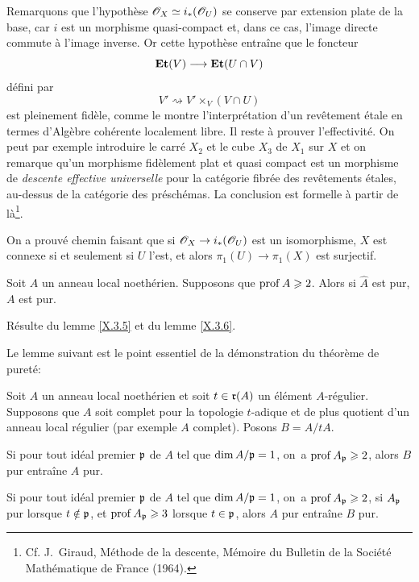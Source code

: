 Remarquons que l'hypoth\`ese $\mathscr{O}_X\simeq i_\ast({\mathscr O}_U)$ se conserve par extension plate de la base, car $i$ est un morphisme quasi-compact et, dans ce cas, l'image directe commute \`a l'image inverse. Or cette hypoth\`ese entra\^ine que le foncteur
\[
\Et(V) \to \Et(U\cap V)
\]
d\'efini par
\[
V'\rightsquigarrow V'\times_V(V\cap U)
\]
est pleinement fid\`ele, comme le montre l'interpr\'etation d'un rev\^etement \'etale en termes d'Alg\`ebre coh\'erente localement libre. Il reste \`a prouver l'effectivit\'e. On peut par exemple introduire le carr\'e $X_2$ et le cube $X_3$ de $X_1$ sur $X$ et on remarque qu'un morphisme fid\`element plat et quasi compact est un morphisme de \emph{descente effective universelle} pour la cat\'egorie fibr\'ee des rev\^etements \'etales, au-dessus de la cat\'egorie des pr\'esch\'emas. La conclusion est formelle \`a partir de l\`a\footnote{Cf. J.~Giraud, M\'ethode de la descente, M\'emoire  du Bulletin de la Soci\'et\'e Math\'ematique de France (1964).}.

\begin{remarque} \label{X.3.7}
On a prouv\'e chemin faisant que si $\OX\to i_\ast(\Oo_U)$ est un isomorphisme, $X$ est connexe si et seulement si $U$ l'est, et alors $\pi_1(U)\to\pi_1(X)$ est surjectif.
\end{remarque}

\begin{corollaire} \label{X.3.8}
Soit $A$ un anneau local noeth\'erien. Supposons que $\operatorname{prof} A\geqslant 2$. Alors si $\hat{A}$ est pur, $A$ est pur.
\end{corollaire}

R\'esulte du lemme \ref{X.3.5} et du lemme \ref{X.3.6}.

Le lemme suivant est le point essentiel de la d\'emonstration du th\'eor\`eme de puret\'e:

\begin{lemme} \label{X.3.9}
Soit $A$ un anneau local noeth\'erien et soit $t\in\mathfrak{r}(A)$ un \'el\'ement $A$-r\'egulier. Supposons que $A$ soit complet pour la topologie $t$-adique et de plus quotient d'un anneau local r\'egulier (par exemple $A$ complet). Posons $B=A/tA$.
\begin{enumeratei}
\item
Si pour tout id\'eal premier $\mathfrak{p}$ de $A$ tel que $\dim A/\mathfrak{p}=1$, on~a $\operatorname{prof} A_{\mathfrak{p}}\geqslant 2$, alors $B$ pur entra\^ine $A$ pur.

\item
Si pour tout id\'eal premier $\mathfrak{p}$ de $A$ tel que $\dim A/\mathfrak{p}=1$, on~a $\operatorname{prof} A_{\mathfrak{p}}\geqslant 2$, si $A_{\mathfrak{p}}$ pur lorsque $t\notin\mathfrak{p}$, et \ignorespaces $\operatorname{prof} A_{\mathfrak{p}}\geqslant3$ lorsque $t\in\mathfrak{p}$, alors $A$ pur entra\^ine $B$ pur.
\end{enumeratei}
\end{lemme}

